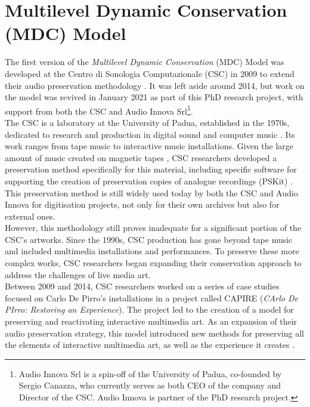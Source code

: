 \section{Multilevel Dynamic Conservation (MDC) Model}
The first version of the \textit{Multilevel Dynamic Conservation} (MDC) Model was developed at the Centro di Sonologia Computazionale (CSC) in 2009 to extend their audio preservation methodology \cite{bressan2016atr, fantozzi2017tape, pretto2019computing}. It was left aside around 2014, but work on the model was revived in January 2021 as part of this PhD research project, with support from both the CSC and Audio Innova Srl\footnote{Audio Innova Srl is a spin-off of the University of Padua, co-founded by Sergio Canazza, who currently serves as both CEO of the company and Director of the CSC. Audio Innova is partner of the PhD research project.}.\\
The CSC is a laboratory at the University of Padua, established in the 1970s, dedicated to research and production in digital sound and computer music \cite{canazza2019four, canazza2022gesture}. Its work ranges from tape music to interactive music installations. Given the large amount of music created on magnetic tapes \cite{pretto2020active}, CSC researchers developed a preservation method specifically for this material, including specific software for supporting the creation of preservation copies of analogue recordings (PSKit) \cite{fantozzi2017tape}. This preservation method is still widely used today by both the CSC and Audio Innova for digitisation projects, not only for their own archives but also for external ones.\\
However, this methodology still proves inadequate for a significant portion of the CSC's artworks. Since the 1990s, CSC production has gone beyond tape music and included multimedia installations and performances. To preserve these more complex works, CSC researchers began expanding their conservation approach to address the challenges of live media art.\\
Between 2009 and 2014, CSC researchers worked on a series of case studies focused on Carlo De Pirro’s installations in a project called CAPIRE (\textit{CArlo De PIrro: Restoring an Experience}). The project led to the creation of a model for preserving and reactivating interactive multimedia art. As an expansion of their audio preservation strategy, this model introduced new methods for preserving all the elements of interactive multimedia art, as well as the experience it creates \cite{bressan2014challenge}.\\
